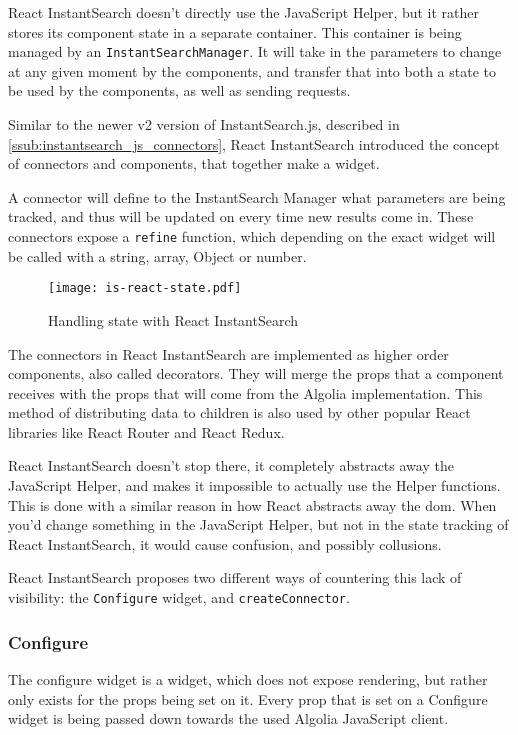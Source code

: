 React InstantSearch doesn't directly use the JavaScript Helper, but it rather stores its component state in a separate container. This container is being managed by an {\tt InstantSearchManager}. It will take in the parameters to change at any given moment by the components, and transfer that into both a state to be used by the components, as well as sending requests.

Similar to the newer v2 version of InstantSearch.js, described in \ref{ssub:instantsearch_js_connectors}, React InstantSearch introduced the concept of connectors and components, that together make a widget.

A connector will define to the InstantSearch Manager what parameters are being tracked, and thus will be updated on every time new results come in. These connectors expose a {\tt refine} function, which depending on the exact widget will be called with a string, array, Object or number.

\begin{figure}[H]
  \centering
  \texttt{[image: is-react-state.pdf]}
  \caption{Handling state with React InstantSearch}
  \label{figure:is-react-state}
\end{figure}

The connectors in React InstantSearch are implemented as higher order components, also called decorators. They will merge the \gls{props} that a component receives with the \gls{props} that will come from the Algolia implementation. This method of distributing data to children is also used by other popular React libraries like React Router and React Redux.

React InstantSearch doesn't stop there, it completely abstracts away the JavaScript Helper, and makes it impossible to actually use the Helper functions. This is done with a similar reason in how React abstracts away the \acrshort{dom}. When you'd change something in the JavaScript Helper, but not in the state tracking of React InstantSearch, it would cause confusion, and possibly collusions.

React InstantSearch proposes two different ways of countering this lack of visibility: the {\tt Configure} widget, and {\tt createConnector}.

\subsubsection{Configure}
\label{ssub:ris-configure}

The configure widget is a widget, which does not expose rendering, but rather only exists for the \gls{props} being set on it. Every prop that is set on a Configure widget is being passed down towards the used Algolia JavaScript client.

